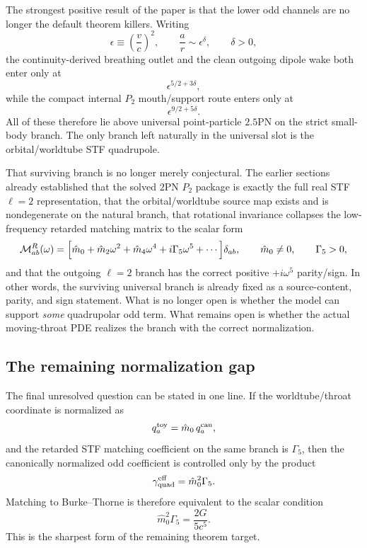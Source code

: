 \documentclass[11pt]{article}
\begin{document}
The strongest positive result of the paper is that the lower odd channels are no
longer the default theorem killers.  Writing
\[
\epsilon\equiv \left(\frac{v}{c}\right)^2,
\qquad
\frac{a}{r}\sim \epsilon^\delta,
\qquad \delta>0,
\]
the continuity-derived breathing outlet and the clean outgoing dipole wake both
enter only at
\[
\epsilon^{5/2+3\delta},
\]
while the compact internal $P_2$ mouth/support route enters only at
\[
\epsilon^{9/2+5\delta}.
\]
All of these therefore lie above universal point-particle $2.5$PN on the strict
small-body branch.  The only branch left naturally in the universal slot is the
orbital/worldtube STF quadrupole.

That surviving branch is no longer merely conjectural.  The earlier sections
already established that the solved $2$PN $P_2$ package is exactly the full real
STF $\ell=2$ representation, that the orbital/worldtube source map exists and is
nondegenerate on the natural branch, that rotational invariance collapses the
low-frequency retarded matching matrix to the scalar form
\[
\mathcal M_{ab}^R(\omega)
=
\Bigl[
\hat m_0+\hat m_2\omega^2+\hat m_4\omega^4+i\Gamma_5\omega^5+\cdots
\Bigr]\delta_{ab},
\qquad
\hat m_0\neq 0,
\qquad
\Gamma_5>0,
\]
and that the outgoing $\ell=2$ branch has the correct positive
$+i\omega^5$ parity/sign.  In other words, the surviving universal branch is
already fixed as a source-content, parity, and sign statement.  What is no
longer open is whether the model can support \emph{some} quadrupolar odd term.
What remains open is whether the actual moving-throat PDE realizes the branch
with the correct normalization.

\subsection{The remaining normalization gap}
\label{sec:conditional-theorem-gap-normalization}

The final unresolved question can be stated in one line.  If the worldtube/throat
coordinate is normalized as
\[
q_a^{\rm toy}=\hat m_0\,q_a^{\rm can},
\]
and the retarded STF matching coefficient on the same branch is $\Gamma_5$, then
the canonically normalized odd coefficient is controlled only by the product
\[
\gamma_{\rm quad}^{\rm eff}=\hat m_0^2\Gamma_5.
\]
Matching to Burke--Thorne is therefore equivalent to the scalar condition
\[
\boxed{
\hat m_0^2\Gamma_5=\frac{2G}{5c^5}.
}
\]
This is the sharpest form of the remaining theorem target.
\end{document}
